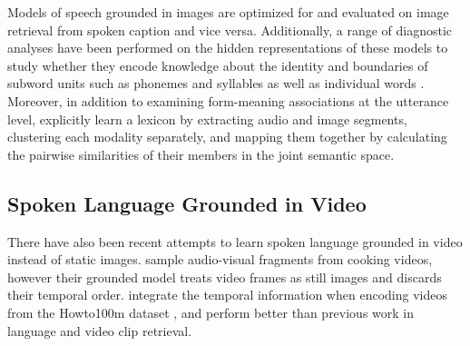 Models of speech grounded in images are optimized for and evaluated on
image retrieval from spoken caption and vice versa. Additionally, a range of
diagnostic analyses have been performed on the hidden
representations of these models to study whether they encode knowledge
about the identity and boundaries of subword units such as phonemes
and syllables \cite{alishahi-etal-2017-encoding, harwath2019towards,
  khorrami_2021} as well as individual words
\cite{chrupala-etal-2017-representations,havard2019word}. Moreover, in
addition to examining form-meaning associations at the utterance
level, \citet{harwath2017learning} explicitly learn a lexicon by
extracting audio and image segments, clustering each modality
separately, and mapping them together by calculating the pairwise
similarities of their members in the joint semantic space.

\subsection{Spoken Language Grounded in Video}
\label{sec:video}
There have also been recent attempts to learn spoken language grounded
in video instead of static images.  \citet{boggust2019grounding}
sample audio-visual fragments from cooking videos, however their
grounded model treats video frames as still images and discards their
temporal order.
\citet{rouditchenko2020avlnet} integrate the temporal information when
encoding videos from the Howto100m dataset \cite{miech2019howto100m},
and perform better than previous work in language and video clip
retrieval.

